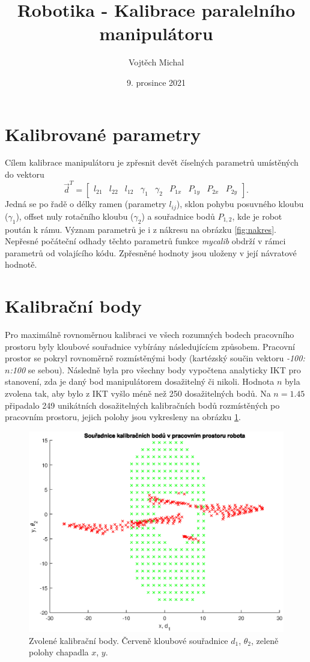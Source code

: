 \documentclass[twoside]{article}
\title{Robotika - Kalibrace paralelního manipulátoru}
\author{Vojtěch Michal}
\date{9. prosince 2021}
\begin{document}
\maketitle

\section{Kalibrované parametry}

Cílem kalibrace manipulátoru je zpřesnit devět číselných parametrů umístěných do vektoru
\begin{equation}
	\vec{d}^T = \begin{bmatrix}
		l_{21} & l_{22} & l_{12} & \gamma_1 & \gamma_2 & P_{1x} & P_{1y} & P_{2x} & P_{2y}
	\end{bmatrix}.
\end{equation}
Jedná se po řadě o délky ramen (parametry $l_{ij}$), sklon pohybu posuvného kloubu ($\gamma_1$), offset nuly rotačního kloubu ($\gamma_2$)
a souřadnice bodů $P_{1,2}$, kde je robot poután k rámu. Význam parametrů je i z nákresu na obrázku \ref{fig:nakres}.
Nepřesné počáteční odhady těchto parametrů funkce \textit{mycalib} obdrží v rámci parametrů od volajícího kódu. Zpřesněné hodnoty jsou uloženy
v její návratové hodnotě.

\section{Kalibrační body}
Pro maximálně rovnoměrnou kalibraci ve všech rozumných bodech pracovního prostoru byly kloubové souřadnice vybírány následujícícm způsobem.
Pracovní prostor se pokryl rovnoměrně rozmístěnými body (kartézský součin vektoru \textit{-100:$n$:100} se sebou).
Následně byla pro všechny body vypočtena analyticky IKT pro stanovení, zda je daný bod manipulátorem dosažitelný či nikoli.
Hodnota $n$ byla zvolena tak, aby bylo z IKT vyšlo méně než 250 dosažitelných bodů.
Na $n = 1.45$ připadalo 249 unikátních dosažitelných kalibračních bodů rozmístěných po pracovním prostoru,
jejich polohy jsou vykresleny na obrázku \ref{fig:kalib_body}.

\begin{figure}[htbp]
	\centering
	\includegraphics[width=0.7\linewidth]{kalib_body.eps}
	\caption{Zvolené kalibrační body. Červeně kloubové souřadnice $d_1$, $\theta_2$, zeleně polohy chapadla $x$, $y$.}
	\label{fig:kalib_body}	
\end{figure}
\end{document}
